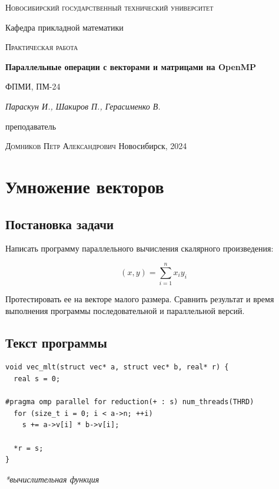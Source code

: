 \documentclass[12pt, a4paper]{article}
\begin{document}
\begin{titlepage}
  \centering
  \textsc{Новосибирский государственный технический университет}\par
  \vspace{1mm}
  Кафедра прикладной математики\par
  \vspace{4cm}
  \textsc{Практическая работа }\par
  {\huge\bfseries Параллельные операции с векторами и матрицами на OpenMP\par}
  \vspace{1cm}
  {\scriptsize ФПМИ, ПМ-24\par}
  \vspace{1mm}
  {\itshape\large Параскун И., Шакиров П., Герасименко В.\par}
  \vfill
  {\small преподаватель\par}
  \vspace{1mm}
  \textsc{Домников Петр Александрович}
  \vfill
  \large{Новосибирск, 2024}
\end{titlepage}

\newpage
\setcounter{page}{2}

\section{Умножение векторов}
\subsection{Постановка задачи}
Написать программу параллельного вычисления скалярного произведения:

$$ (x, y) = \sum_{i=1}^{n} x_iy_i $$

\noindent Протестировать ее на векторе малого размера. Сравнить результат и время выполнения программы последовательной
и параллельной версий.

\subsection{Текст программы}

\begin{verbatim}
void vec_mlt(struct vec* a, struct vec* b, real* r) {
  real s = 0;

#pragma omp parallel for reduction(+ : s) num_threads(THRD)
  for (size_t i = 0; i < a->n; ++i)
    s += a->v[i] * b->v[i];

  *r = s;
}
\end{verbatim}
\textit{*вычислительная функция}
\end{document}

